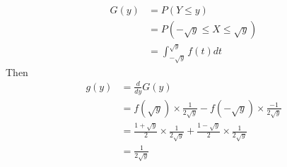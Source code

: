 \documentclass[answers]{exam}
\begin{document}
\begin{questions}
\begin{solution}
	\begin{align*}
		G(y) &= P(Y\leq y) \\
		     &= P(-\sqrt{y}\leq X\leq \sqrt{y}) \\
		     &= \int_{-\sqrt{y}}^{\sqrt{y}} f(t)dt
	\end{align*}
	Then
	\begin{align*}
		g(y) &= \frac{d}{dy}G(y) \\
		     &= f(\sqrt{y})\times\frac{1}{2\sqrt{y}} - f(-\sqrt{y})\times\frac{-1}{2\sqrt{y}} \\
		     &= \frac{1+\sqrt{y}}{2}\times\frac{1}{2\sqrt{y}} + \frac{1-\sqrt{y}}{2}\times\frac{1}{2\sqrt{y}} \\
		     &= \frac{1}{2\sqrt{y}}
	\end{align*}
\end{solution}
\end{questions}
\end{document}
